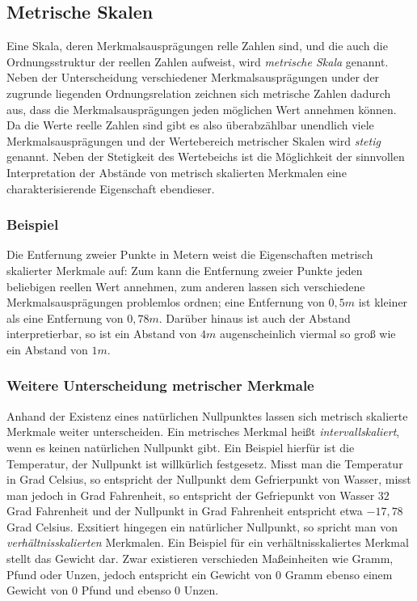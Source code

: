 \documentclass[a4paper]{scrartcl}
\begin{document}
\begin{multicols}{2}
                \subsection{Metrische Skalen}
                    Eine Skala, deren Merkmalsausprägungen relle Zahlen sind, und die auch die Ordnungsstruktur der reellen Zahlen aufweist, wird \emph{metrische Skala} genannt. Neben der Unterscheidung verschiedener Merkmalsausprägungen under der zugrunde liegenden Ordnungsrelation zeichnen sich metrische Zahlen dadurch aus, dass die Merkmalsausprägungen jeden möglichen Wert annehmen können. Da die Werte reelle Zahlen sind gibt es also überabzählbar unendlich viele Merkmalsausprägungen und der Wertebereich metrischer Skalen wird \emph{stetig} genannt. Neben der Stetigkeit des Wertebeichs ist die Möglichkeit der sinnvollen Interpretation der Abstände von metrisch skalierten Merkmalen eine charakterisierende Eigenschaft ebendieser.
                    \cite{kohn2005}
                    \subsubsection{Beispiel}
                        Die Entfernung zweier Punkte in Metern weist die Eigenschaften metrisch skalierter Merkmale auf: Zum kann die Entfernung zweier Punkte jeden beliebigen reellen Wert annehmen, zum anderen lassen sich verschiedene Merkmalsausprägungen problemlos ordnen; eine Entfernung von $ 0,5m $ ist kleiner als eine Entfernung von $ 0,78m $. Darüber hinaus ist auch der Abstand interpretierbar, so ist ein Abstand von $4m$ augenscheinlich viermal so groß wie ein Abstand von $1m$.
                    \subsubsection{Weitere Unterscheidung metrischer Merkmale}
                        Anhand der Existenz eines natürlichen Nullpunktes lassen sich metrisch skalierte Merkmale weiter unterscheiden. Ein metrisches Merkmal heißt \emph{intervallskaliert}, wenn es keinen natürlichen Nullpunkt gibt. \cite{kohn2005} Ein Beispiel hierfür ist die Temperatur, der Nullpunkt ist willkürlich festgesetz. Misst man die Temperatur in Grad Celsius, so entspricht der Nullpunkt dem Gefrierpunkt von Wasser, misst man jedoch in Grad Fahrenheit, so entspricht der Gefriepunkt von Wasser $32$ Grad Fahrenheit und der Nullpunkt in Grad Fahrenheit entspricht etwa $-17,78$ Grad Celsius.
                        \newline
                        Exsitiert hingegen ein natürlicher Nullpunkt, so spricht man von \emph{verhältnisskalierten} Merkmalen. \cite{kohn2005}
                        \newline
                        Ein Beispiel für ein verhältnisskaliertes Merkmal stellt das Gewicht dar. Zwar existieren verschieden Maßeinheiten wie Gramm, Pfund oder Unzen, jedoch entspricht ein Gewicht von $0$ Gramm ebenso einem Gewicht von $0$ Pfund und ebenso $0$ Unzen.
                

\end{multicols}
\end{document}

